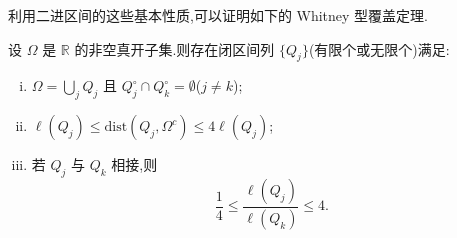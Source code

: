 利用二进区间的这些基本性质,可以证明如下的 Whitney 型覆盖定理.

\begin{theorem}\label{thm:1.6.4}
设 $\Omega$ 是 $\mathbb{R}$ 的非空真开子集.则存在闭区间列 $\{Q_{j}\}$(有限个或无限个)满足:
\begin{enumerate}[(i)]
\item $\Omega = \bigcup_{j}Q_{j}$ 且 $Q_{j}^{\circ} \cap Q_{k}^{\circ} = \emptyset$($j \neq k$);
\item $\ell(Q_{j}) \leq \mathrm{dist}(Q_{j}, \Omega^{c}) \leq 4\ell(Q_{j})$;
\item 若 $Q_{j}$ 与 $Q_{k}$ 相接,则
\begin{equation*}
\frac{1}{4} \leq \frac{\ell(Q_{j})}{\ell(Q_{k})} \leq 4.
\end{equation*}
\end{enumerate}
\end{theorem}

